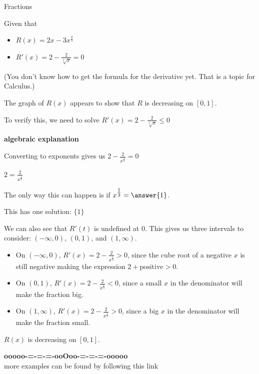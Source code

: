 \documentclass{ximera}
\begin{document}
\begin{example}  Fractions


Given that

\begin{itemize}
\item $R(x) = 2x - 3 x^{\tfrac{2}{3}}$
\item $R'(x) = 2 - \frac{2}{\sqrt[3]{x}} = 0$
\end{itemize}
(You don't know how to get the formula for the derivative yet.  That is a topic for Calculus.)

The graph of $R(x)$ appears to show that $R$ is decreasing on $[0, 1]$.
\begin{center}
\end{center}










To verify this, we need to solve $R'(x) = 2 - \frac{2}{\sqrt[3]{x}}  \leq 0$



\textbf{\textcolor{red!75!green}{algebraic explanation}} 


Converting to exponents gives us $2 - \frac{2}{x^{\tfrac{1}{3}}} = 0$


$2 = \frac{2}{x^{\tfrac{1}{3}}}$

The only way this can happen is if $x^{\tfrac{1}{3}} = \answer{1}$.

This has one solution: $\{  1  \}$



We can also see that $R'(t)$ is undefined at $0$.  This gives us three intervals to consider: $(-\infty, 0)$, $(0, 1)$, and $(1, \infty)$.



\begin{itemize}
\item On $(-\infty, 0)$, $R'(x) = 2 - \frac{2}{x^{\tfrac{1}{3}}} > 0$, since the cube root of a negative $x$ is still negative making the expression $2 + \text{positive} > 0$.
\item On $(0,1)$, $R'(x) = 2 - \frac{2}{x^{\tfrac{1}{3}}} < 0$, since a small $x$ in the denominator will make the fraction big.
\item On $(1,\infty)$, $R'(x) = 2 - \frac{2}{x^{\tfrac{1}{3}}} > 0$, since a big $x$ in the denominator will make the fraction small.
\end{itemize}


$R(x)$ is decreasing on $[0,1]$.



\end{example}
















\begin{center}
\textbf{\textcolor{green!50!black}{ooooo-=-=-=-ooOoo-=-=-=-ooooo}} \\

more examples can be found by following this link\\ 

\end{center}
\end{document}

